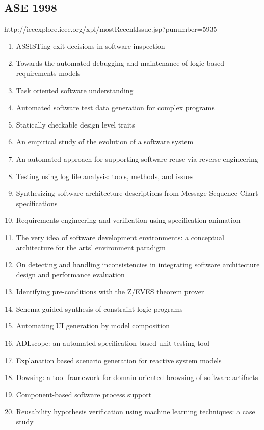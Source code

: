 \subsection{ASE 1998}

http://ieeexplore.ieee.org/xpl/mostRecentIssue.jsp?punumber=5935

\begin{enumerate}[itemsep=-1ex]
  \item ASSISTing exit decisions in software inspection
  \item Towards the automated debugging and maintenance of logic-based requirements models
  \item Task oriented software understanding
  \item Automated software test data generation for complex programs
  \item Statically checkable design level traits
  \item An empirical study of the evolution of a software system
  \item An automated approach for supporting software reuse via reverse engineering
  \item Testing using log file analysis: tools, methods, and issues
  \item Synthesizing software architecture descriptions from Message Sequence Chart specifications
  \item Requirements engineering and verification using specification animation
  \item The very idea of software development environments: a conceptual architecture for the arts' environment paradigm
  \item On detecting and handling inconsistencies in integrating software architecture design and performance evaluation
  \item Identifying pre-conditions with the Z/EVES theorem prover
  \item Schema-guided synthesis of constraint logic programs
  \item Automating UI generation by model composition
  \item ADLscope: an automated specification-based unit testing tool
  \item Explanation based scenario generation for reactive system models
  \item Dowsing: a tool framework for domain-oriented browsing of software artifacts
  \item Component-based software process support
  \item Reusability hypothesis verification using machine learning techniques: a case study

\end{enumerate}
